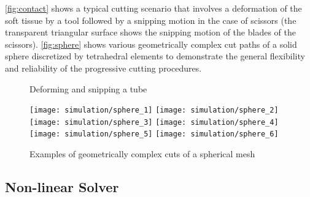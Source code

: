 \autoref{fig:contact} shows a typical cutting scenario that involves a deformation of the soft tissue by a tool followed by a snipping motion in the case of scissors (the transparent triangular surface shows the snipping motion of the blades of the scissors).
\autoref{fig:sphere} shows various geometrically complex cut paths of a solid sphere discretized by tetrahedral elements to demonstrate the general flexibility and reliability of the progressive cutting procedures.
\begin{figure}
  \centering%
  \setlength{\fboxsep}{0pt}%
  \setlength{\fboxrule}{0.1pt}%
  \caption{Deforming and snipping a tube}\label{fig:contact}
\end{figure}

\begin{figure}
  \centering%
	\texttt{[image: simulation/sphere\_1]}\hfill%
	\texttt{[image: simulation/sphere\_2]}\\[1.5ex]
	\texttt{[image: simulation/sphere\_3]}\hfill%
	\texttt{[image: simulation/sphere\_4]}\\[1.5ex]
	\texttt{[image: simulation/sphere\_5]}\hfill%
	\texttt{[image: simulation/sphere\_6]}\\
	\caption{Examples of geometrically complex cuts of a spherical mesh}\label{fig:sphere}
\end{figure}




\subsection{Non-linear Solver}\label{ssec:nonlinear_solver}

